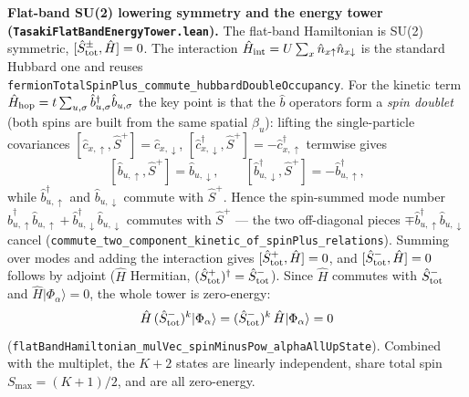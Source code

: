 \documentclass[a4paper,11pt]{article}
\begin{document}
\medskip
\noindent\textbf{Flat-band SU(2) lowering symmetry and the energy tower
(\texttt{TasakiFlatBandEnergyTower.lean}).}
The flat-band Hamiltonian is SU(2) symmetric, $[\hat S^\pm_{\rm tot},\hat H] = 0$.
The interaction $\hat H_{\rm int} = U\sum_x \hat n_{x\uparrow}\hat n_{x\downarrow}$
is the standard Hubbard one and reuses
\texttt{fermionTotalSpinPlus\_commute\_hubbardDoubleOccupancy}. For the kinetic
term $\hat H_{\rm hop} = t\sum_{u,\sigma}\hat b^\dagger_{u,\sigma}\hat b_{u,\sigma}$
the key point is that the $\hat b$ operators form a \emph{spin doublet} (both
spins are built from the same spatial $\beta_u$): lifting the single-particle
covariances $[\hat c_{x,\uparrow},\hat S^+] = \hat c_{x,\downarrow}$,
$[\hat c^\dagger_{x,\downarrow},\hat S^+] = -\hat c^\dagger_{x,\uparrow}$ termwise
gives
\[
  [\hat b_{u,\uparrow},\hat S^+] = \hat b_{u,\downarrow},\qquad
  [\hat b^\dagger_{u,\downarrow},\hat S^+] = -\hat b^\dagger_{u,\uparrow},
\]
while $\hat b^\dagger_{u,\uparrow}$ and $\hat b_{u,\downarrow}$ commute with
$\hat S^+$. Hence the spin-summed mode number
$\hat b^\dagger_{u,\uparrow}\hat b_{u,\uparrow} +
\hat b^\dagger_{u,\downarrow}\hat b_{u,\downarrow}$ commutes with $\hat S^+$ --- the
two off-diagonal pieces $\mp\hat b^\dagger_{u,\uparrow}\hat b_{u,\downarrow}$ cancel
(\texttt{commute\_two\_component\_kinetic\_of\_spinPlus\_relations}). Summing over
modes and adding the interaction gives $[\hat S^+_{\rm tot},\hat H] = 0$, and
$[\hat S^-_{\rm tot},\hat H] = 0$ follows by adjoint ($\hat H$ Hermitian,
$(\hat S^+_{\rm tot})^\dagger = \hat S^-_{\rm tot}$). Since $\hat H$ commutes with
$\hat S^-_{\rm tot}$ and $\hat H|\Phi_\alpha\rangle = 0$, the whole tower is
zero-energy:
\[
  \hat H\,(\hat S^-_{\rm tot})^k|\Phi_\alpha\rangle
    = (\hat S^-_{\rm tot})^k\,\hat H|\Phi_\alpha\rangle = 0
\]
(\texttt{flatBandHamiltonian\_mulVec\_spinMinusPow\_alphaAllUpState}). Combined with
the multiplet, the $K+2$ states are linearly independent, share total spin
$S_{\max} = (K+1)/2$, and are all zero-energy.
\end{document}
